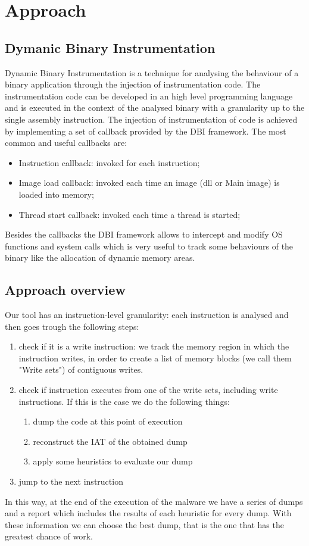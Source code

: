 \chapter{Approach}
\label{chapter3}
\thispagestyle{empty}

\section{Dymanic Binary Instrumentation}
Dynamic Binary Instrumentation is a technique for analysing the behaviour of a binary application through the injection of instrumentation code. The instrumentation code can be developed in an high level programming language and is executed in the context of the analysed binary with a granularity up to the single assembly instruction. The injection of instrumentation of code is achieved by implementing a set of callback provided by the DBI framework. The most common and useful callbacks are:
\begin{itemize}
 \item Instruction callback: invoked for each instruction;
 \item Image load callback: invoked each time an image (dll or Main image) is loaded into memory;
  \item Thread start callback: invoked each time a thread is started;
\end{itemize}
Besides the callbacks the DBI framework allows to intercept and modify OS functions and system calls which is very useful to track some behaviours of the binary like the allocation of dynamic memory areas.


\section{Approach overview}
Our tool has an instruction-level granularity: each instruction is analysed and then goes trough the following steps:
\begin{enumerate}
\item check if it is a write instruction: we track the memory region in which the instruction writes, in order to create a list of memory blocks (we call them "Write sets") of contiguous writes.
\item check if instruction executes from one of the write sets, including write instructions. If this is the case we do the following things:
	\begin{enumerate}
	\item dump the code at this point of execution
	\item reconstruct the IAT of the obtained dump
	\item apply some heuristics to evaluate our dump 
	\end{enumerate}
\item jump to the next instruction
\end{enumerate}
In this way, at the end of the execution of the malware we have a series of dumps and a report which includes the results of each heuristic for every dump. With these information we can choose the best dump, that is the one that has the greatest chance of work.\\

